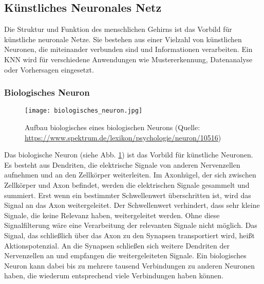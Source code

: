 \subsection{Künstliches Neuronales Netz}
Die Struktur und Funktion des menschlichen Gehirns ist das Vorbild für künstliche neuronale Netze. Sie bestehen aus einer Vielzahl von künstlichen Neuronen, die miteinander verbunden sind und Informationen verarbeiten. Ein \ac{KNN} wird für verschiedene Anwendungen wie Mustererkennung, Datenanalyse oder Vorhersagen eingesetzt.

\subsubsection{Biologisches Neuron}

\begin{figure}[h]
	\centering
	\texttt{[image: biologisches\_neuron.jpg]}
	\caption{Aufbau biologisches eines biologischen Neurons (Quelle: \url{https://www.spektrum.de/lexikon/psychologie/neuron/10516})}		\label{fig:BioNeuron}
\end{figure}

Das biologische Neuron (siehe Abb. \ref{fig:BioNeuron}) ist das Vorbild für künstliche Neuronen. Es besteht aus Dendriten, die elektrische Signale von anderen Nervenzellen aufnehmen und an den Zellkörper weiterleiten. 
Im Axonhügel, der sich zwischen Zellkörper und Axon befindet, werden die elektrischen Signale gesammelt und summiert. Erst wenn ein bestimmter Schwellenwert überschritten ist, wird das Signal an das Axon weitergeleitet. Der Schwellenwert verhindert, dass sehr kleine Signale, die keine Relevanz haben, weitergeleitet werden. Ohne diese Signalfilterung wäre eine Verarbeitung der relevanten Signale nicht möglich. Das Signal, das schließlich über das Axon zu den Synapsen transportiert wird, heißt Aktionspotenzial. An die Synapsen schließen sich weitere Dendriten der Nervenzellen an und empfangen die weitergeleiteten Signale. Ein biologisches Neuron kann dabei bis zu mehrere tausend Verbindungen zu anderen Neuronen haben, die wiederum entsprechend viele Verbindungen haben können.\cite[vgl.][]{Posthoff2022,JuergenCleve2020}

